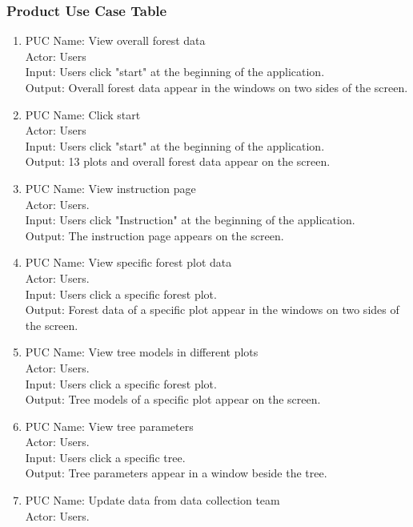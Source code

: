 \documentclass{article}
\begin{document}
\subsubsection{Product Use Case Table}
\begin{enumerate}
    \item PUC Name: View overall forest data\\
    Actor: Users\\
    Input: Users click "start" at the beginning of the application.\\
    Output: Overall forest data appear in the windows on two sides of the screen. 
    \item PUC Name: Click start\\
    Actor: Users\\
    Input: Users click "start" at the beginning of the application.\\
    Output: 13 plots and overall forest data appear on the screen.
    \item PUC Name: View instruction page\\
    Actor: Users.\\
    Input: Users click "Instruction" at the beginning of the application.\\
    Output: The instruction page appears on the screen. 
    \item PUC Name: View specific forest plot data\\
    Actor: Users.\\
    Input: Users click a specific forest plot.\\
    Output: Forest data of a specific plot appear in the windows on two sides of
    the screen. 
    \item PUC Name: View tree models in different plots\\
    Actor: Users.\\
    Input: Users click a specific forest plot.\\
    Output: Tree models of a specific plot appear on the screen.
    \item PUC Name: View tree parameters\\
    Actor: Users.\\
    Input: Users click a specific tree.\\
    Output: Tree parameters appear in a window beside the tree.
    \item PUC Name: Update data from data collection team\\
    Actor: Users.\\

\end{enumerate}
\end{document}
